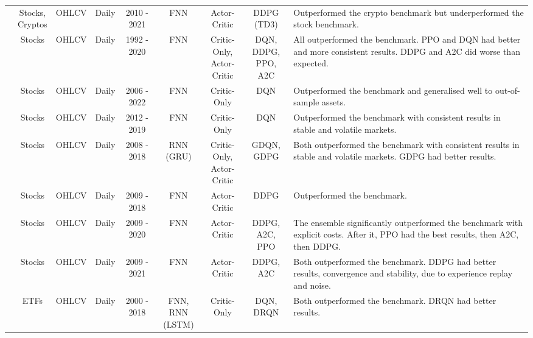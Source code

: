 \begin{table}
\begin{tabularx}{\linewidth}{@{}ccccccccX@{}}
\cite{majidi_algorithmic_2022} & \makecell{Stocks, \\ Cryptos} & OHLCV & Daily & 2010 - 2021 & FNN & Actor-Critic & DDPG (TD3) & Outperformed the crypto benchmark but underperformed the stock benchmark. \\

\cite{sagiraju_application_2021} & Stocks & OHLCV & Daily & 1992 - 2020 & FNN & \makecell{Critic-Only, \\ Actor-Critic} & \makecell{DQN, DDPG, \\ PPO, A2C} & All outperformed the benchmark. PPO and DQN had better and more consistent results. DDPG and A2C did worse than expected. \\

\cite{sim_generalized_2023} & Stocks & OHLCV & Daily & 2006 - 2022 & FNN & Critic-Only & DQN & Outperformed the benchmark and generalised well to out-of-sample assets. \\

\cite{theate_application_2021} & Stocks & OHLCV & Daily & 2012 - 2019 & FNN & Critic-Only & DQN & Outperformed the benchmark with consistent results in stable and volatile markets. \\

\cite{wu_adaptive_2020} & Stocks & OHLCV & Daily & 2008 - 2018 & RNN (GRU) & \makecell{Critic-Only, \\ Actor-Critic} & \makecell{GDQN, \\ GDPG} & Both outperformed the benchmark with consistent results in stable and volatile markets. GDPG had better results. \\
 
\cite{xiong_practical_2018} & Stocks & OHLCV & Daily & 2009 - 2018 & FNN & Actor-Critic & DDPG & Outperformed the benchmark. \\

\cite{yang_deep_2020} & Stocks & OHLCV & Daily & 2009 - 2020 & FNN & Actor-Critic & \makecell{DDPG, \\ A2C, PPO} & The ensemble significantly outperformed the benchmark with explicit costs. After it, PPO had the best results, then A2C, then DDPG. \\

\cite{yousefi_deep_2022} & Stocks & OHLCV & Daily & 2009 - 2021 & FNN & Actor-Critic & DDPG, A2C & Both outperformed the benchmark. DDPG had better results, convergence and stability, due to experience replay and noise. \\

\cite{chen_application_2019} & ETFs & OHLCV & Daily & 2000 - 2018 & \makecell{FNN, \\ RNN (LSTM)} & Critic-Only & \makecell{DQN, \\  DRQN} & Both outperformed the benchmark. DRQN had better results. \\


\end{tabularx}
\end{table}
